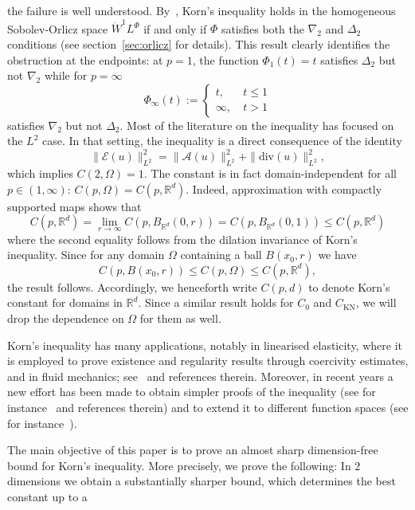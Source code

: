 \documentclass[11pt, a4paper]{amsart}
\theoremstyle{definition}
\theoremstyle{remark}
\newcommand{\R}{\mathbb{R}}
\begin{document}
the failure is well understood.
By~\cite{Breit2011}, Korn's inequality holds in the 
homogeneous
Sobolev-Orlicz space $\dot{W}^1L^\Phi$ 
if and only if
$\Phi$ satisfies both
the $\nabla_2$ and $\Delta_2$ conditions
(see section~\ref{sec:orlicz} for details).
This result clearly identifies the obstruction
at the endpoints:
at $p=1$, the function $\Phi_1(t)=t$
satisfies $\Delta_2$ but not $\nabla_2$
while for $p=\infty$
\[\Phi_\infty(t):=\begin{cases}
t,\ &t\le 1\\ 
\infty,\ &t>1
\end{cases}\] satisfies $\nabla_2$
but not $\Delta_2$.
Most of the literature on 
the inequality has focused on
the $L^2$ case. In that setting,
the inequality is a direct consequence
of the identity \[\|\mathcal 
E(u)\|_{L^2}^2=\|
\mathcal A(u)\|_{L^2}^2+
\|\text{div}(u)\|_{L^2}^2,
\] 
which implies
$C(2,\Omega)= 
1$. The constant is in fact
domain-independent for all $p\in(1,\infty)$:
$C(p,\Omega)=C(p,\R^d)$. Indeed,
approximation with compactly supported maps
shows that
\begin{equation*}
C(p,\R^d)=\lim_{r\to \infty} C(p, B_{\R^d}(0,r))
=C(p,B_{\R^d}(0,1))\le C(p, \R^d)
\end{equation*}
where the second equality follows from
the dilation invariance of Korn's inequality.
Since for any domain $\Omega$ containing
a ball $B(x_0,r)$ we have 
\begin{equation*}
C(p, B(x_0,r))\le C(p,\Omega)\le C(p,\R^d),
\end{equation*}
the result follows.
Accordingly, we henceforth write $C(p,d)$ to denote
Korn's constant for domains in $\R^d$.
Since a similar result holds for $C_0$
and $C_{\mathrm{KN}}$, we will drop the dependence
on $\Omega$ for them as well.\par
Korn's inequality has many applications,
notably in linearised elasticity, where it 
is employed to prove existence and regularity results
through coercivity estimates, and in
fluid mechanics; see~\cite{applied} and references
therein. Moreover, in recent years a 
new effort has been made to obtain simpler proofs
of the inequality (see for instance~\cite{PoinKorn}
and references therein) and to 
extend it to different function spaces
(see for instance~\cite{spector}).\par
The main objective of this paper is
to prove an almost sharp 
dimension-free bound for Korn's inequality.
More precisely, we prove the following:
In $2$ dimensions we obtain a substantially sharper
bound, which determines the best constant up to a
\end{document}
